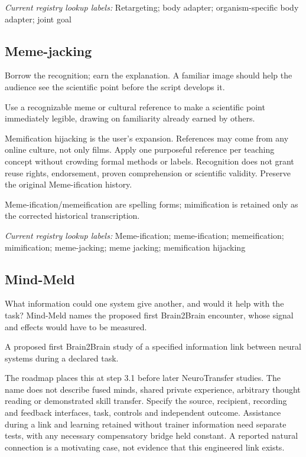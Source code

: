 \noindent\textit{Current registry lookup labels:} Retargeting; body adapter; organism-specific body adapter; joint goal\par

\begin{samepage}
\subsection*{Meme-jacking}
\noindent Borrow the recognition; earn the explanation. A familiar image should help the audience see the scientific point before the script develops it.\par
\end{samepage}
\noindent Use a recognizable meme or cultural reference to make a scientific point immediately legible, drawing on familiarity already earned by others.\par
\begin{samepage}
\noindent Memification hijacking is the user’s expansion. References may come from any online culture, not only films. Apply one purposeful reference per teaching concept without crowding formal methods or labels. Recognition does not grant reuse rights, endorsement, proven comprehension or scientific validity. Preserve the original Meme-ification history.\par\nopagebreak[4]

\end{samepage}
\noindent Meme-ification/memeification are spelling forms; mimification is retained only as the corrected historical transcription.\par


\noindent\textit{Current registry lookup labels:} Meme-ification; meme-ification; memeification; mimification; meme-jacking; meme jacking; memification hijacking\par

\subsection*{Mind-Meld}
\noindent What information could one system give another, and would it help with the task? Mind-Meld names the proposed first Brain2Brain encounter, whose signal and effects would have to be measured.\par
\noindent A proposed first Brain2Brain study of a specified information link between neural systems during a declared task.\par
\noindent The roadmap places this at step 3.1 before later NeuroTransfer studies. The name does not describe fused minds, shared private experience, arbitrary thought reading or demonstrated skill transfer. Specify the source, recipient, recording and feedback interfaces, task, controls and independent outcome. Assistance during a link and learning retained without trainer information need separate tests, with any necessary compensatory bridge held constant. A reported natural connection is a motivating case, not evidence that this engineered link exists.\par

